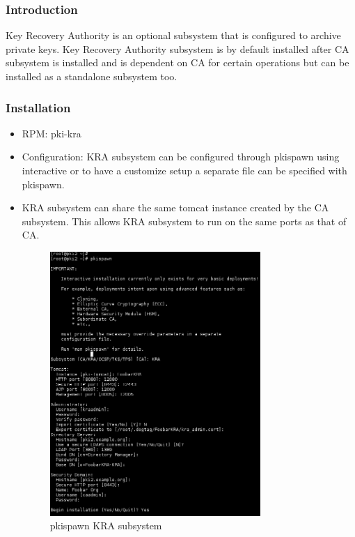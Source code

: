 \documentclass[a4paper]{article}
\begin{document}
\subsubsection{Introduction}
Key Recovery Authority is an optional subsystem that is configured to archive private keys. Key Recovery Authority
subsystem is by default installed after CA subsystem is installed and is dependent on CA for certain operations
but can be installed as a standalone subsystem too.
\subsubsection{Installation}
\begin{itemize}
    \item RPM: pki-kra
    \item Configuration: KRA subsystem can be configured through pkispawn using interactive or to have a customize
        setup a separate file can be specified with pkispawn.

    \item KRA subsystem can share the same tomcat instance created by the CA subsystem. This allows KRA subsystem
        to run on the same ports as that of CA.

        \begin{figure}[H]
            \centering
            \includegraphics[width=80mm]{pkispawn-kra.png}
            \caption{pkispawn KRA subsystem}
        \end{figure}
\end{itemize}
\end{document}
